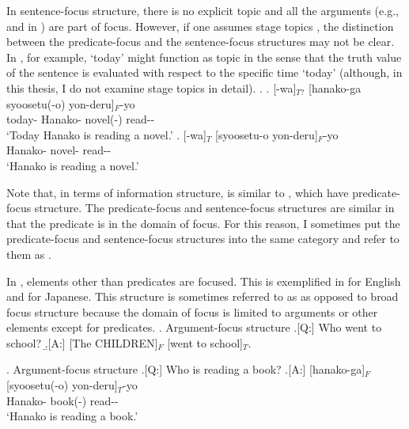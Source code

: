 In sentence-focus structure,
there is no explicit topic and all the arguments (e.g.,  and  in \Last[A]) are part of focus.
However, if one assumes stage topics \cite{erteschik-shir97,erteschik-shir07},
the distinction between the predicate-focus and the sentence-focus structures may not be clear.
In \Next[a], for example,
 `today' might function as topic in the sense that
the truth value of the sentence is evaluated with respect to the specific time `today' (although, in this thesis, I do not examine stage topics in detail).
\ex. 
	\ag. [-wa]$_{T?}$ [hanako-ga syoosetu(-o) yon-deru]$_{F}$-yo \\
		today- Hanako- novel(-) read-- \\
		`Today Hanako is reading a novel.'
		\bg. [-wa]$_{T}$ [syoosetu-o yon-deru]$_{F}$-yo \\
		Hanako- novel- read-- \\
		`Hanako is reading a novel.'

Note that, in terms of information structure,
\Last[a] is similar to \Last[b],
which have predicate-focus structure.
The predicate-focus and sentence-focus structures are similar
in that the predicate is in the domain of focus.
For this reason, I sometimes put the predicate-focus and sentence-focus structures into the same category
and refer to them as .

In ,
elements other than predicates are focused.
This is exemplified in \Next[A] for English
and \NNext[A] for Japanese.
This structure is sometimes referred to as 
as opposed to broad focus structure
because the domain of focus is limited to arguments or other elements except for predicates.
\ex. Argument-focus structure
	\a.[Q:] Who went to school?
	\b.[A:] [The CHILDREN]$_{F}$ [went to school]$_{T}$. \hfill{\cite[][p.\ 121]{lambrecht94}}

\ex. Argument-focus structure
	\a.[Q:] Who is reading a book?
	\bg.[A:] [hanako-ga]$_{F}$ [syoosetu(-o) yon-deru]$_{T}$-yo \\
		Hanako- book(-) read-- \\
		`Hanako is reading a book.'


